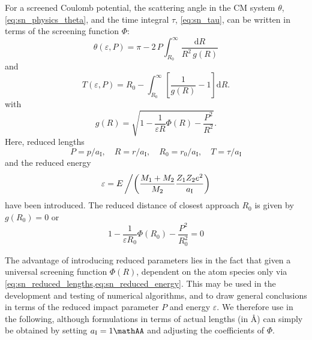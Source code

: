 
For a screened Coulomb potential, the scattering angle in the CM system $\theta$, \cref{eq:sn_physics_theta}, and the time integral $\tau$, \cref{eq:sn_tau}, can be written in terms of the screening function $\Phi$:
%
\begin{equation}
    \label{eq:sn_reduced_theta}
    \theta(\varepsilon,P) = \pi - 2 \, P \int_{R_0}^\infty
        \frac{ \mathrm{d}R }{ R^2 \, g(R) }
\end{equation}
%
and
%
\begin{equation}
\label{eq:sn_reduced_tau}
    T(\varepsilon,P) = R_0 - \int_{R_0}^\infty \left[
        \frac{ 1 }{ g(R) } - 1 \right] \mathrm{d}R.
\end{equation}
%
with
%
\begin{equation}
    \label{eq:sn_reduced_g}
    g(R) = \sqrt{ 1 - \frac{ 1 }{ \varepsilon R } \Phi(R)
        - \frac{ P^2 }{ R^2 } } .
\end{equation}
%
Here, reduced lengths
%
\begin{equation}
    \label{eq:sn_reduced_lengths}
    P = p/a_\mathrm{I}, \quad R = r/a_\mathrm{I}, \quad R_0 = r_0/a_\mathrm{I}, \quad T = \tau/a_\mathrm{I}
\end{equation}
%
and the reduced energy
%
\begin{equation}
    \label{eq:sn_reduced_energy}
    \varepsilon = E \left/ \left( \frac{ M_1 + M_2 }{ M_2 }
        \frac{ Z_1 Z_2 e^2 }{ a_\mathrm{I} } \right) \right.
\end{equation}
%
have been introduced. The reduced distance of closest approach $R_0$ is given by $g(R_0) = 0$ or
%
\begin{equation}
    \label{eq:sn_apsis}
    1 - \frac{ 1 }{ \varepsilon R_0 } \Phi(R_0) - \frac{ P^2 }{ R_0^2 } = 0
\end{equation}

The advantage of introducing reduced parameters lies in the fact that given a universal screening function $\Phi(R)$,  dependent on the atom species only via \cref{eq:sn_reduced_lengths,eq:sn_reduced_energy}.
This may be used in the development and testing of numerical algorithms, and to draw general conclusions in terms of the reduced impact parameter $P$ and energy $\varepsilon$.
We therefore use  in the following, although formulations in terms of actual lengths (in \AA) can simply be obtained by setting $a_\mathrm{I} = 1 \mathAA$ and adjusting the coefficients of $\Phi$.
